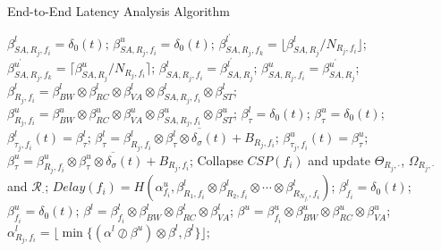 \documentclass[10pt,journal]{IEEEtran}
\begin{document}
\begin{algorithm}
\caption{End-to-End Latency Analysis Algorithm}
\label{alg:equivalentservicecurve}
\begin{algorithmic}[1]
            \STATE $\beta_{SA,R_j,f_i}^l=\delta_0(t)$; $\beta_{SA,R_j,f_i}^u=\delta_0(t)$;
        \ENDFOR
    \ENDFOR
                    \STATE $\beta_{SA,R_j,f_k}^{l^\prime}=\lfloor\beta_{SA,R_j}^l/N_{R_j,f_i}\rfloor$;
                    \STATE $\beta_{SA,R_j,f_k}^{u^\prime}=\lceil\beta_{SA,R_j}^u/N_{R_j,f_i}\rceil$;
                \ENDFOR
            \ENDIF
                \STATE $\beta_{SA,R_j,f_i}^l=\beta_{SA,R_j}^{l^\prime}$; $\beta_{SA,R_j,f_i}^u=\beta_{SA,R_j}^{u^\prime}$;
            \ENDIF
            \STATE $\beta_{R_j,f_i}^l=\beta_{BW}^l\otimes\beta_{RC}^l\otimes\beta_{VA}^l\otimes\beta_{SA,R_j,f_i}^l\otimes \beta_{ST}^l$;
            \STATE $\beta_{R_j,f_i}^u=\beta_{BW}^u\otimes\beta_{RC}^u\otimes\beta_{VA}^u\otimes\beta_{SA,R_j,f_i}^u\otimes \beta_{ST}^u$;
        \ENDFOR
        \STATE $\beta_{\tau}^l=\delta_0(t)$; $\beta_{\tau}^u=\delta_0(t)$;
            \STATE $\beta^{l}_{\tau_j,f_i}(t)=\beta_{\tau}^l$; $\beta_{\tau}^l=\overline{\beta^l_{R_j,f_i}\otimes\beta^{l}_{\tau}\otimes\delta_\sigma(t)+B_{R_j,f_i}}$;
            \STATE $\beta^{u}_{\tau_j,f_i}(t)=\beta_{\tau}^u$; $\beta_{\tau}^u=\overline{\beta^u_{R_j,f_i}\otimes\beta^{u}_{\tau}\otimes\delta_\sigma(t)+B_{R_j,f_i}}$;
        \ENDFOR
        \STATE Collapse $CSP(f_i)$ and update $\Theta_{R_j,\cdot}$, $\Omega_{R_j,\cdot}$ and $\mathcal{R}_{\cdot}$;
        \STATE $Delay(f_i)=H(\alpha^u_{f_i},\beta^l_{R_1,f_i}\otimes\beta^l_{R_2,f_i}\otimes\cdots\otimes\beta^l_{R_{N_{f_i}},f_i})$;
        \STATE $\beta_{f_i}^l=\delta_0(t)$; $\beta_{f_i}^u=\delta_0(t)$;
            \STATE $\beta^l=\beta^l_{f_i}\otimes\beta_{BW}^l\otimes\beta_{RC}^l\otimes\beta_{VA}^l$;
            \STATE $\beta^u=\beta^u_{f_i}\otimes\beta_{BW}^u\otimes\beta_{RC}^u\otimes\beta_{VA}^u$;
            \STATE $\alpha^l_{R_j,f_i}=\lfloor\min\{(\alpha^l\oslash\beta^u)\otimes\beta^l,\beta^l\}\rfloor$;

\end{algorithmic}
\end{algorithm}
\end{document}
